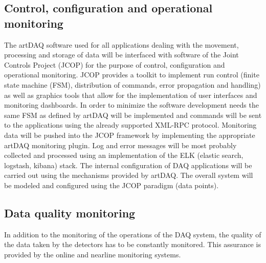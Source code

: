 \subsection{Control, configuration and operational monitoring}
The artDAQ software used for all applications dealing with the movement,
processing and storage of data will be interfaced with software of the
Joint Controls Project (JCOP) for the purpose of control, configuration
and operational monitoring.  JCOP provides a toolkit to implement run
control (finite state machine (FSM), distribution of commands, error
propagation and handling) as well as graphics tools that allow for the
implementation of user interfaces and monitoring dashboards.  In order to
minimize the software development needs the same FSM as defined by artDAQ
will be implemented and commands will be sent to the applications using
the already supported XML-RPC protocol.  Monitoring data will be pushed
into the JCOP framework by implementing the appropriate artDAQ monitoring
plugin.  Log and error messages will be most probably collected and
processed using an implementation of the ELK (elastic search, logstash,
kibana) stack. 
 The internal configuration of DAQ applications will be
carried out using the mechanisms provided by artDAQ. The overall system
will be modeled and configured using the JCOP paradigm (data points).



\subsection{Data quality monitoring}

In addition to the monitoring of the operations of the DAQ system, the
quality of the data taken by the detectors has to be constantly monitored.
This assurance is provided by the online and nearline monitoring systems.

